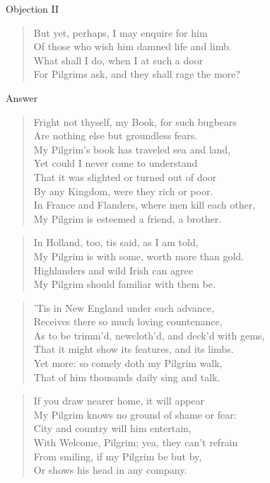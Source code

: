 Objection II
\begin{verse}
But yet, perhaps, I may enquire for him\\
Of those who wish him damned life and limb.\\
What shall I do, when I at such a door\\
For Pilgrims ask, and they shall rage the more?\\
\end{verse}
Answer
\begin{verse}
Fright not thyself, my Book, for such bugbears\\
Are nothing else but groundless fears.\\
My Pilgrim's book has traveled sea and land,\\
Yet could I never come to understand\\
That it was slighted or turned out of door\\
By any Kingdom, were they rich or poor.\\
In France and Flanders, where men kill each other,\\
My Pilgrim is esteemed a friend, a brother.\\
\end{verse}
\begin{verse}
In Holland, too, tis said, as I am told,\\
My Pilgrim is with some, worth more than gold.\\
Highlanders and wild Irish can agree\\
My Pilgrim should familiar with them be.\\
\end{verse}
\begin{verse}
'Tis in New England under such advance,\\
Receives there so much loving countenance,\\
As to be trimm'd, newcloth'd, and deck'd with gems,\\
That it might show its features, and its limbs.\\
Yet more: so comely doth my Pilgrim walk,\\
That of him thousands daily sing and talk.\\
\end{verse}
\begin{verse}
If you draw nearer home, it will appear\\
My Pilgrim knows no ground of shame or fear:\\
City and country will him entertain,\\
With Welcome, Pilgrim; yea, they can't refrain\\
From smiling, if my Pilgrim be but by,\\
Or shows his head in any company.\\
\end{verse}
